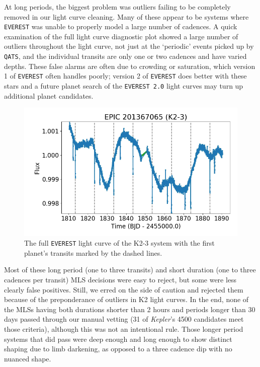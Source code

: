 \documentclass[twocolumn]{aastex62}
\newcommand{\project}[1]{\textsl{#1}}
\newcommand{\pipeline}[1]{\texttt{#1}}
\begin{document}
At long periods, the biggest problem was outliers failing to be
completely removed in our light curve cleaning. Many of these appear
to be systems where \pipeline{EVEREST} was unable to properly model a
large number of cadences. A quick examination of the full light curve
diagnostic plot showed a large number of outliers throughout the light
curve, not just at the `periodic' events picked up by \pipeline{QATS},
and the individual transits are only one or two cadences and have
varied depths. These false alarms are often due to crowding or
saturation, which version 1 of \pipeline{EVEREST} often handles
poorly; version 2 of \pipeline{EVEREST} does better with these stars
and a future planet search of the \pipeline{EVEREST 2.0} light curves
may turn up additional planet candidates.

\begin{figure}[tbp]
\includegraphics[width=\columnwidth]{lightcurve.png}
\caption{The full \pipeline{EVEREST} light curve of the K2-3 system
  with the first planet's transits marked by the dashed
  lines. \label{lightcurve}}
\end{figure}

Most of these long period (one to three transits) and short duration
(one to three cadences per transit) MLS decisions were easy to reject,
but some were less clearly false positives. Still, we erred on the
side of caution and rejected them because of the preponderance of
outliers in K2 light curves. In the end, none of the MLSs having both
durations shorter than 2 hours and periods longer than 30 days passed
through our manual vetting (31 of \project{Kepler}'s 4500 candidates
meet those criteria), although this was not an intentional rule. Those
longer period systems that did pass were deep enough and long enough
to show distinct shaping due to limb darkening, as opposed to a three
cadence dip with no nuanced shape.
\end{document}
